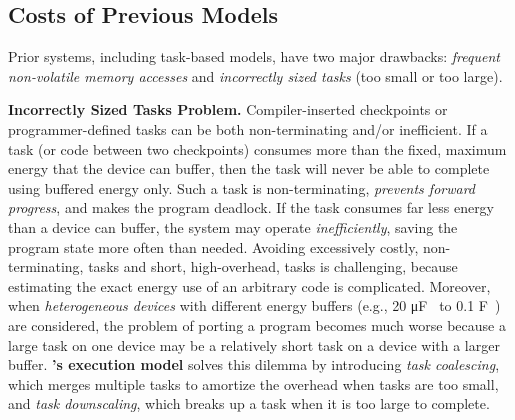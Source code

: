 \subsection{Costs of Previous Models}
\label{sec:cost_task-based}

Prior systems, including task-based models, have two major drawbacks: {\em frequent non-volatile memory accesses} and {\em incorrectly sized tasks} (too small or too large).


\textbf{Incorrectly Sized Tasks Problem.} Compiler-inserted checkpoints or programmer-defined tasks can be both non-terminating and/or inefficient.  If a task (or code between two checkpoints) consumes more than the fixed, maximum energy that the device can buffer, then the task will never be able to complete using buffered energy only.  Such a task is non-terminating, {\em prevents forward progress}, and makes the program deadlock. If the task consumes far less energy than a device can buffer, the system may operate {\em inefficiently}, saving the program state more often than needed. Avoiding excessively costly, non-terminating, tasks and short, high-overhead, tasks is challenging, because estimating the exact energy use of an arbitrary code is complicated. Moreover, when \emph{heterogeneous devices} with different energy buffers (e.g., 20 \si{\micro\farad}~\cite{rodriguez_tbcs_2015} to 0.1 \si{\farad}~\cite{moo}) are considered, the problem of porting a program becomes much worse because a large task on one device may be a relatively short task on a device with a larger buffer. \textbf{\sys's execution model} solves this dilemma by introducing {\em task coalescing}, which merges multiple tasks to amortize the overhead when tasks are too small, and {\em task downscaling}, which breaks up a task when it is too large to complete. 
